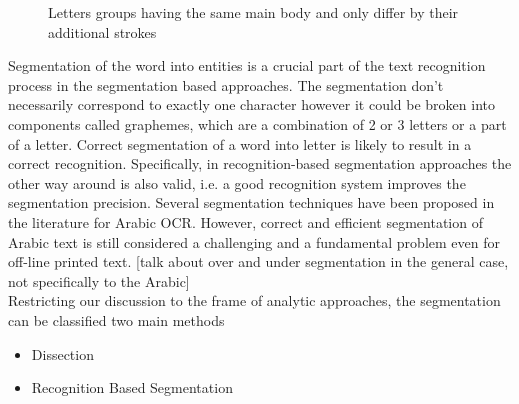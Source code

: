 \documentclass[journal,compsoc]{IEEEtran}
\begin{document}
\begin{figure}[h]
\centering
    \caption{
        Letters groups having the same main body and only differ by their additional strokes
     }
   \label{fig:same_main_body_letters}
\end{figure}

Segmentation of the word into entities is a crucial part of the text recognition process in the segmentation based approaches. The segmentation don't necessarily correspond to exactly one character however it could be broken into components called graphemes, which are a combination of 2 or 3 letters or a part of a letter.  Correct segmentation of a word into letter is likely to result in a correct recognition. Specifically, in recognition-based segmentation approaches the other way around is also valid, i.e. a good recognition system improves the segmentation precision. Several segmentation techniques have been proposed in the literature for Arabic OCR. However, correct and efficient segmentation of Arabic text is still considered a challenging and a fundamental problem even for off-line printed text.
[talk about over and under segmentation in the general case, not specifically to the Arabic]\\


Restricting our discussion to the frame of analytic approaches, the segmentation can be classified two main methods
\begin{itemize}
  \item Dissection
  \item Recognition Based Segmentation
\end{itemize}
\end{document}
